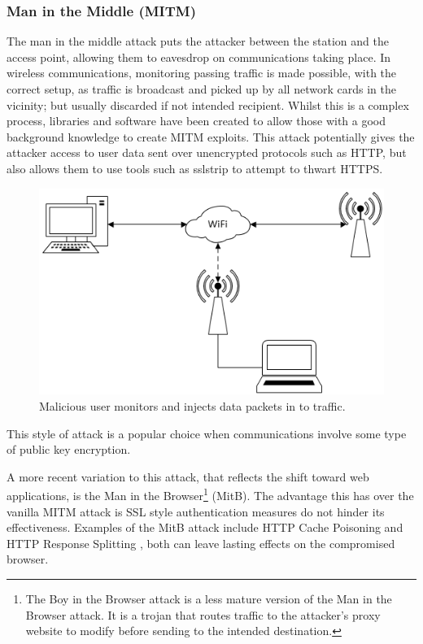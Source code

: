 \subsubsection{Man in the Middle (MITM)}
\label{mitm-sec}
The man in the middle attack puts the attacker between the station and the access point, allowing them to eavesdrop on communications taking place. In wireless communications, monitoring passing traffic is made possible, with the correct setup, as traffic is broadcast and picked up by all network cards in the vicinity; but usually discarded if not intended recipient. Whilst this is a complex process, libraries and software have been created to allow those with a good background knowledge to create MITM exploits. This attack potentially gives the attacker access to user data sent over unencrypted protocols such as HTTP, but also allows them to use tools such as sslstrip \cite{research:ssl_strip} to attempt to thwart HTTPS.

\begin{figure}[h!]
\includegraphics[width=\linewidth]{research/figures/mitm.png}
\caption{Malicious user monitors and injects data packets in to traffic.}
\end{figure}

This style of attack is a popular choice when communications involve some type of public key encryption. 

A more recent variation to this attack, that reflects the shift toward web applications, is the Man in the Browser\footnote{The Boy in the Browser attack \cite{research:bitb} is a less mature version of the Man in the Browser attack. It is a trojan that routes traffic to the attacker’s proxy website to modify before sending to the intended destination.} (MitB). The advantage this has over the vanilla MITM attack is SSL style authentication measures do not hinder its effectiveness. Examples of the MitB attack include HTTP Cache Poisoning \cite{research:cache_poisoning} and HTTP Response Splitting \cite{research:response_splitting}, both can leave lasting effects on the compromised browser.

